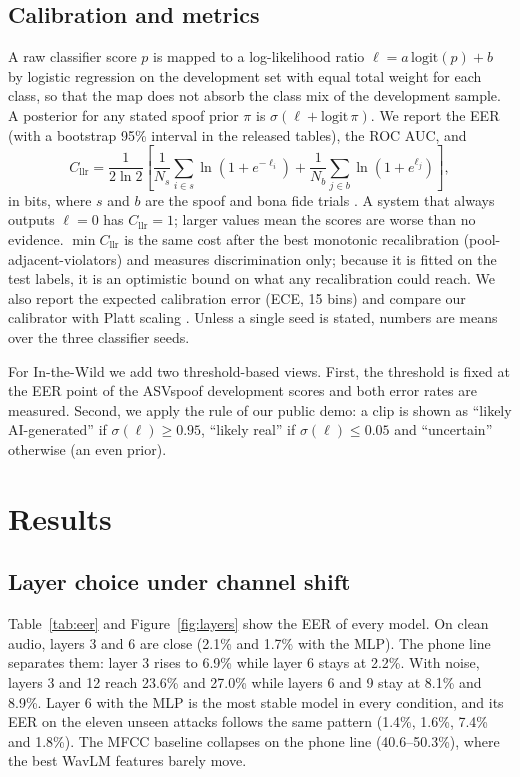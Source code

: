 \documentclass[10pt,a4paper]{article}
\begin{document}
\subsection{Calibration and metrics}
A raw classifier score $p$ is mapped to a log-likelihood ratio $\ell = a\,\mathrm{logit}(p) + b$ by logistic
regression on the development set with equal total weight for each class, so that the map does not absorb the class
mix of the development sample. A posterior for any stated spoof prior $\pi$ is $\sigma(\ell + \mathrm{logit}\,\pi)$.
We report the EER (with a bootstrap 95\% interval in the released tables), the ROC AUC, and
\begin{equation}
C_\mathrm{llr} = \frac{1}{2\ln 2}\left[\frac{1}{N_s}\sum_{i\in s}\ln\!\left(1+e^{-\ell_i}\right)
+ \frac{1}{N_b}\sum_{j\in b}\ln\!\left(1+e^{\ell_j}\right)\right],
\end{equation}
in bits, where $s$ and $b$ are the spoof and bona fide trials \cite{brummer2006application}. A system that always
outputs $\ell=0$ has $C_\mathrm{llr}=1$; larger values mean the scores are worse than no evidence. $\min C_\mathrm{llr}$
is the same cost after the best monotonic recalibration (pool-adjacent-violators) and measures discrimination only; because it is fitted on the test labels, it is an optimistic bound on what any recalibration could reach.
We also report the expected calibration error (ECE, 15 bins) \cite{guo2017calibration} and compare our calibrator
with Platt scaling \cite{platt1999probabilistic}. Unless a single seed is stated, numbers are means over the three
classifier seeds.

For In-the-Wild we add two threshold-based views. First, the threshold is fixed at the EER point of the ASVspoof
development scores and both error rates are measured. Second, we apply the rule of our public demo: a clip is shown
as ``likely AI-generated'' if $\sigma(\ell)\ge 0.95$, ``likely real'' if $\sigma(\ell)\le 0.05$ and ``uncertain''
otherwise (an even prior).

\section{Results}
\subsection{Layer choice under channel shift}
Table~\ref{tab:eer} and Figure~\ref{fig:layers} show the EER of every model. On clean audio, layers 3 and 6 are
close (2.1\% and 1.7\% with the MLP). The phone line separates them: layer 3 rises to 6.9\% while layer 6 stays at
2.2\%. With noise, layers 3 and 12 reach 23.6\% and 27.0\% while layers 6 and 9 stay at 8.1\% and 8.9\%. Layer 6 with
the MLP is the most stable model in every condition, and its EER on the eleven unseen attacks follows the same pattern
(1.4\%, 1.6\%, 7.4\% and 1.8\%). The MFCC baseline collapses on the phone line (40.6--50.3\%), where the best WavLM
features barely move.
\end{document}
